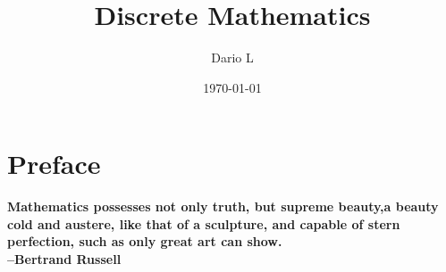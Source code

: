 \documentclass[a4paper,11pt]{book}
\author{Dario L}
\title{Discrete Mathematics}
\date{\today}
\begin{document}
\frontmatter
\maketitle

\chapter*{Preface}
\textbf{Mathematics possesses not only truth, but supreme beauty,a beauty cold and austere, like that of a sculpture,
and capable of stern perfection, such as only great art can show.\\ --Bertrand Russell}



\tableofcontents

\mainmatter


\end{document}
